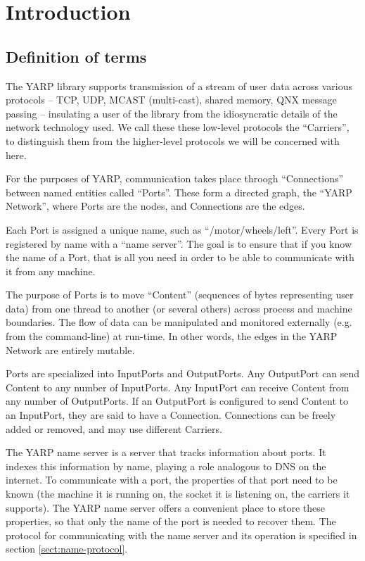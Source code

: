 \chapter{Introduction}

\section{Definition of terms}

The YARP library supports transmission of a stream of
user data across
various protocols -- TCP, UDP, MCAST (multi-cast), shared memory, QNX
message passing -- insulating a user of the library from the
idiosyncratic details of the network technology used.  We call these
these low-level protocols the ``Carriers'', to distinguish them from
the higher-level protocols we will be concerned with here.

For the purposes of YARP, communication takes place throogh
``Connections'' between named entities called ``Ports''.
These form a directed graph, the ``YARP Network'', where Ports are the nodes,
and Connections are the edges.

Each Port is assigned a unique name, such as ``/motor/wheels/left''.  
Every Port is registered by name with
a ``name server''.  The goal is to ensure that if you know the name
of a Port, that is all you need in order to be able to 
communicate with it from any machine.

The purpose of Ports is to move ``Content'' (sequences of bytes representing 
user data) from
one thread to another (or several others) across process and machine
boundaries.  The flow of data can be manipulated and monitored
externally (e.g. from the command-line) at run-time.  In other words,
the edges in the YARP Network are entirely mutable.

Ports are specialized into InputPorts and OutputPorts.
Any OutputPort can send Content to any number of InputPorts.  Any
InputPort can receive Content from any number of OutputPorts.  If an
OutputPort is configured to send Content to an InputPort, they are
said to have a Connection.  Connections can be freely added or 
removed, and may use different Carriers.

The YARP name server is a server that tracks information about ports.
It indexes this information by name, playing a role analogous to
DNS on the internet.
%
To communicate with a port, the properties of that port need to be
known (the machine it is running on, the socket it is listening on,
the carriers it supports).  The YARP name server offers a convenient
place to store these properties, so that only the name of the port is
needed to recover them.
%
The protocol for communicating with the name server
and its operation is specified in section \ref{sect:name-protocol}.

